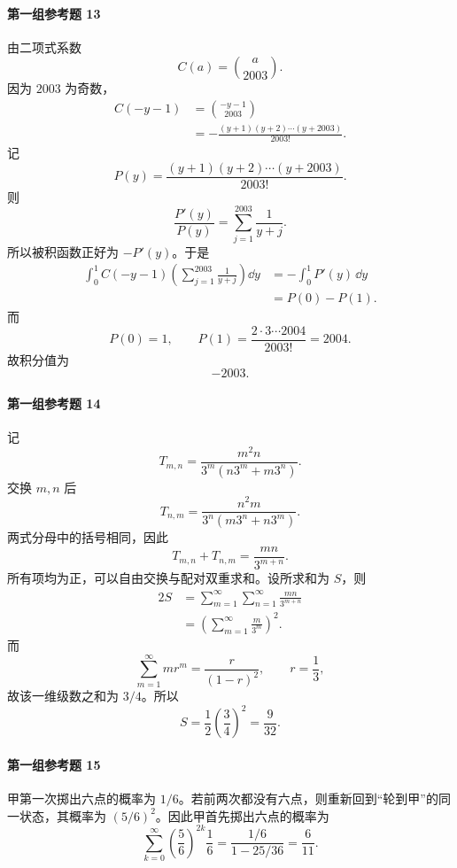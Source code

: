 \paragraph{第一组参考题 13}
\begin{xsolution}
由二项式系数
\[
  C(a)={a\choose2003}.
\]
因为 $2003$ 为奇数，
\[
\begin{aligned}
  C(-y-1)
  &={-y-1\choose2003}\\
  &=-\frac{(y+1)(y+2)\cdots(y+2003)}{2003!}.
\end{aligned}
\]
记
\[
  P(y)=\frac{(y+1)(y+2)\cdots(y+2003)}{2003!}.
\]
则
\[
  \frac{P'(y)}{P(y)}
  =\sum_{j=1}^{2003}\frac1{y+j}.
\]
所以被积函数正好为 $-P'(y)$。于是
\[
\begin{aligned}
  \int_0^1 C(-y-1)
  \left(\sum_{j=1}^{2003}\frac1{y+j}\right)\dd y
  &=-\int_0^1P'(y)\,\dd y\\
  &=P(0)-P(1).
\end{aligned}
\]
而
\[
  P(0)=1,
  \qquad
  P(1)=\frac{2\cdot3\cdots2004}{2003!}=2004.
\]
故积分值为
\[
  \boxed{-2003}.
\]
\end{xsolution}

\paragraph{第一组参考题 14}
\begin{xsolution}
记
\[
  T_{m,n}=\frac{m^2n}{3^m(n3^m+m3^n)}.
\]
交换 $m,n$ 后
\[
  T_{n,m}=\frac{n^2m}{3^n(m3^n+n3^m)}.
\]
两式分母中的括号相同，因此
\[
  T_{m,n}+T_{n,m}
  =\frac{mn}{3^{m+n}}.
\]
所有项均为正，可以自由交换与配对双重求和。设所求和为 $S$，则
\[
\begin{aligned}
  2S
  &=\sum_{m=1}^{\infty}\sum_{n=1}^{\infty}
    \frac{mn}{3^{m+n}}\\
  &=\left(\sum_{m=1}^{\infty}\frac m{3^m}\right)^2.
\end{aligned}
\]
而
\[
  \sum_{m=1}^{\infty}mr^m=\frac r{(1-r)^2},
  \qquad r=\frac13,
\]
故该一维级数之和为 $3/4$。所以
\[
  \boxed{S=\frac12\left(\frac34\right)^2=\frac9{32}}.
\]
\end{xsolution}

\paragraph{第一组参考题 15}
\begin{xsolution}
甲第一次掷出六点的概率为 $1/6$。若前两次都没有六点，则重新回到“轮到甲”的同一状态，其概率为 $(5/6)^2$。因此甲首先掷出六点的概率为
\[
  \sum_{k=0}^{\infty}
  \left(\frac56\right)^{2k}\frac16
  =\frac{1/6}{1-25/36}
  =\boxed{\frac6{11}}.
\]
\end{xsolution}

